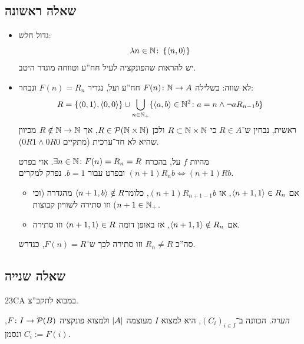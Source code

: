\documentclass[]{../../../../tex/classes/styledArticle}
\begin{document}
	\subsection*{שאלה ראשונה}
	\begin{itemize}
		\item גדול חלש: 
		\[ \lambda n \in \mathbb{N}\colon \left \{ \langle n, 0 \rangle \right \} \]
		יש להראות שהפונקציה לעיל חח''ע וטווחה מוגדר היטב. 
		\item לא שווה: בשלילה $F(n) \colon \mathbb{N} \to A$ חח''ע ועל, נגדיר $F(n) = R_n$ ונבחר: 
		\[ R = \{\langle 0, 1 \rangle , \langle 0, 0 \rangle\} \cup \bigcup_{n \in \mathbb{N}_+}\{\langle a, b \rangle \in \mathbb{N}^{2}\colon a = n \land \lnot aR_{n - 1}b\} \]
		ראשית, נבחין ש־$R \in A$ כי $R \subset \mathbb{N} \times \mathbb{N}$ ולכן $R \in \mathcal{P}(\mathbb{N} \times \mathbb{N})$, אך $R \notin \mathbb{N}\to \mathbb{N}$ מכיוון שהיא לא חד־ערכית (מתקיים $0R1 \land 0R 0$). 
		
		מהיות $f$ על, בהכרח $\exists n\in \mathbb{N} \colon F(n) = R_n = R$. אזי בפרט $(n + 1)R_nb \iff (n + 1)Rb$ ובפרט עבור $b = 1$. נפרק למקרים. 
		\begin{itemize}
			\item אם $\langle n + 1, 1 \rangle \in R_n$, אז $(n + 1)R_{n + 1 - 1}b$, כלומר$\langle n + 1, b \rangle \notin R$ מהגדרה (וכי $n + 1 \in \mathbb{N}_+$) וזו סתירה לשוויון קבוצות. 
			\item אם $\langle n + 1, 1 \rangle \notin R_n$, אז באופן דומה $\langle n + 1, 1 \rangle \in R$ וזו סתירה. 
		\end{itemize}
		סה''כ $R_n \neq R$ וזו סתירה לכך ש־$F(n) = R$, כנדרש. 
	\end{itemize}
	
	\subsection*{שאלה שנייה}
	23CA במבוא לתקב''צ. 
	
	\textit{הערה. }הכוונה ב־$(C_i)_{i \in I}$, היא למצוא $I$ מעוצמה $\left \lvert A \right \rvert$ ולמצוא פונקציה $F \colon I \to \mathcal{P}(B)$, ונסמן $C_i := F(i)$. 
	
\end{document}
